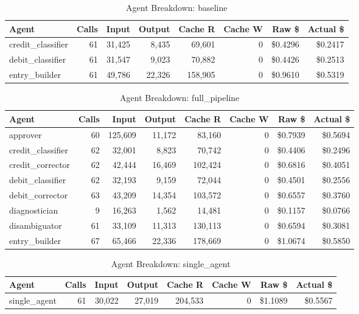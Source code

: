 \begin{table}[htbp]
\centering
\caption{Agent Breakdown: baseline}
\label{tab:agent-baseline}
\begin{tabular}{l r rr rr rr}
\toprule
Agent & Calls & Input & Output & Cache R & Cache W & Raw \$ & Actual \$ \\
\midrule
  credit\_classifier & 61 & 31,425 & 8,435 & 69,601 & 0 & \$0.4296 & \$0.2417 \\
  debit\_classifier & 61 & 31,547 & 9,023 & 70,882 & 0 & \$0.4426 & \$0.2513 \\
  entry\_builder & 61 & 49,786 & 22,326 & 158,905 & 0 & \$0.9610 & \$0.5319 \\
\bottomrule
\end{tabular}
\end{table}

\begin{table}[htbp]
\centering
\caption{Agent Breakdown: full\_pipeline}
\label{tab:agent-full-pipeline}
\begin{tabular}{l r rr rr rr}
\toprule
Agent & Calls & Input & Output & Cache R & Cache W & Raw \$ & Actual \$ \\
\midrule
  approver & 60 & 125,609 & 11,172 & 83,160 & 0 & \$0.7939 & \$0.5694 \\
  credit\_classifier & 62 & 32,001 & 8,823 & 70,742 & 0 & \$0.4406 & \$0.2496 \\
  credit\_corrector & 62 & 42,444 & 16,469 & 102,424 & 0 & \$0.6816 & \$0.4051 \\
  debit\_classifier & 62 & 32,193 & 9,159 & 72,044 & 0 & \$0.4501 & \$0.2556 \\
  debit\_corrector & 63 & 43,209 & 14,354 & 103,572 & 0 & \$0.6557 & \$0.3760 \\
  diagnostician & 9 & 16,263 & 1,562 & 14,481 & 0 & \$0.1157 & \$0.0766 \\
  disambiguator & 61 & 33,109 & 11,313 & 130,113 & 0 & \$0.6594 & \$0.3081 \\
  entry\_builder & 67 & 65,466 & 22,336 & 178,669 & 0 & \$1.0674 & \$0.5850 \\
\bottomrule
\end{tabular}
\end{table}

\begin{table}[htbp]
\centering
\caption{Agent Breakdown: single\_agent}
\label{tab:agent-single-agent}
\begin{tabular}{l r rr rr rr}
\toprule
Agent & Calls & Input & Output & Cache R & Cache W & Raw \$ & Actual \$ \\
\midrule
  single\_agent & 61 & 30,022 & 27,019 & 204,533 & 0 & \$1.1089 & \$0.5567 \\
\bottomrule
\end{tabular}
\end{table}

